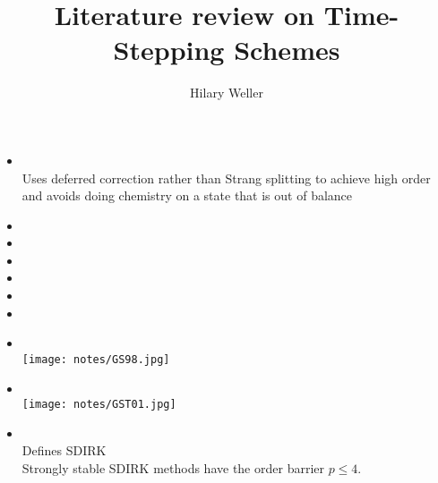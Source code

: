 \documentclass[12pt]{article}
\begin{document}
\title{Literature review on Time-Stepping Schemes}
\author{Hilary Weller}
\maketitle

\begin{itemize}
\item {} \ \\
Uses deferred correction rather than Strang splitting to achieve high order and avoids doing chemistry on a state that is out of balance
\item {}
\item {}
\item {}
\item {}
\item {}
\item {}
\item {} \ \\ \texttt{[image: notes/GS98.jpg]}
\item {} \ \\ \texttt{[image: notes/GST01.jpg]}
\item {} \ \\ Defines SDIRK \\
Strongly stable SDIRK methods have the order barrier $p\le 4$.

\end{itemize}

\end{document}
